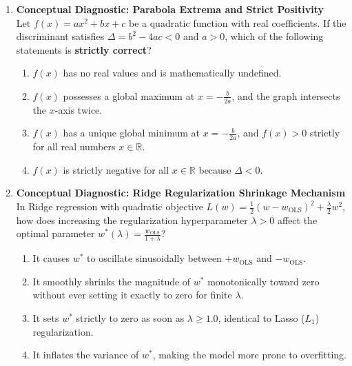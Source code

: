 \begin{enumerate}[resume]
\item \textbf{Conceptual Diagnostic: Parabola Extrema and Strict Positivity} \\
Let $f(x) = a x^2 + b x + c$ be a quadratic function with real coefficients. If the discriminant satisfies $\Delta = b^2 - 4ac < 0$ and $a > 0$, which of the following statements is \textbf{strictly correct}?
\begin{enumerate}
    \item $f(x)$ has no real values and is mathematically undefined.
    \item $f(x)$ possesses a global maximum at $x = -\frac{b}{2a}$, and the graph intersects the $x$-axis twice.
    \item $f(x)$ has a unique global minimum at $x = -\frac{b}{2a}$, and $f(x) > 0$ strictly for all real numbers $x \in \mathbb{R}$.
    \item $f(x)$ is strictly negative for all $x \in \mathbb{R}$ because $\Delta < 0$.
\end{enumerate}

\item \textbf{Conceptual Diagnostic: Ridge Regularization Shrinkage Mechanism} \\
In Ridge regression with quadratic objective $L(w) = \frac{1}{2}(w - w_{\text{OLS}})^2 + \frac{\lambda}{2} w^2$, how does increasing the regularization hyperparameter $\lambda > 0$ affect the optimal parameter $w^*(\lambda) = \frac{w_{\text{OLS}}}{1 + \lambda}$?
\begin{enumerate}
    \item It causes $w^*$ to oscillate sinusoidally between $+w_{\text{OLS}}$ and $-w_{\text{OLS}}$.
    \item It smoothly shrinks the magnitude of $w^*$ monotonically toward zero without ever setting it exactly to zero for finite $\lambda$.
    \item It sets $w^*$ strictly to zero as soon as $\lambda \ge 1.0$, identical to Lasso ($L_1$) regularization.
    \item It inflates the variance of $w^*$, making the model more prone to overfitting.
\end{enumerate}
\end{enumerate}